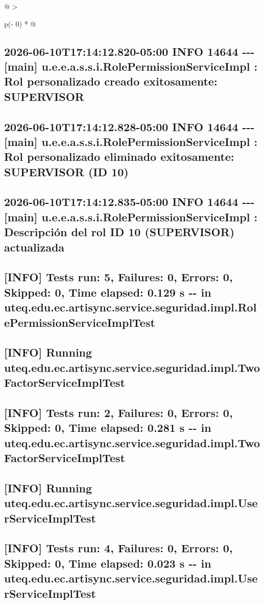 \documentclass[
]{article}
\begin{document}
\begin{longtable}[]{@{}
  >{\raggedright\arraybackslash}p{(\columnwidth - 0\tabcolsep) * }@{}}
\begin{minipage}[b]{\linewidth}
\subsection{2026-06-10T17:14:12.820-05:00 INFO 14644 -\/-\/- {[}main{]}
u.e.e.a.s.s.i.RolePermissionServiceImpl : Rol personalizado creado
exitosamente:
SUPERVISOR}

\subsection{2026-06-10T17:14:12.828-05:00 INFO 14644 -\/-\/- {[}main{]}
u.e.e.a.s.s.i.RolePermissionServiceImpl : Rol personalizado eliminado
exitosamente: SUPERVISOR (ID
10)}

\subsection{2026-06-10T17:14:12.835-05:00 INFO 14644 -\/-\/- {[}main{]}
u.e.e.a.s.s.i.RolePermissionServiceImpl : Descripción del rol ID 10
(SUPERVISOR)
actualizada}

\subsection{{[}INFO{]} Tests run: 5, Failures: 0, Errors: 0, Skipped: 0,
Time elapsed: 0.129 s -\/- in
uteq.edu.ec.artisync.service.seguridad.impl.RolePermissionServiceImplTest}

\subsection{{[}INFO{]} Running
uteq.edu.ec.artisync.service.seguridad.impl.TwoFactorServiceImplTest}

\subsection{{[}INFO{]} Tests run: 2, Failures: 0, Errors: 0, Skipped: 0,
Time elapsed: 0.281 s -\/- in
uteq.edu.ec.artisync.service.seguridad.impl.TwoFactorServiceImplTest}

\subsection{{[}INFO{]} Running
uteq.edu.ec.artisync.service.seguridad.impl.UserServiceImplTest}

\subsection{{[}INFO{]} Tests run: 4, Failures: 0, Errors: 0, Skipped: 0,
Time elapsed: 0.023 s -\/- in
uteq.edu.ec.artisync.service.seguridad.impl.UserServiceImplTest}


\end{minipage}
\end{longtable}
\end{document}
